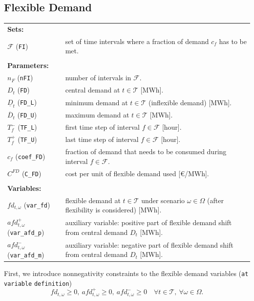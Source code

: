 \subsection{Flexible Demand}
\label{SEC:FlexibleDemand}

\begin{tabularx}{\textwidth}{l X}
\textbf{Sets:} \\
$\mathcal{F}$ (\texttt{FI}) & set of time intervals where a fraction of demand $c_f$ has to be met. \\
\\

\textbf{Parameters:} \\
$n_F$ (\texttt{nFI}) & number of intervals in $\mathcal{F}$. \\
$D_t$ (\texttt{FD}) & central demand at $t \in \mathcal{T}$ [MWh]. \\
$\underline{D}_t$ (\texttt{FD\_L}) & minimum demand at $t \in \mathcal{T}$ (inflexible demand) [MWh]. \\
$\overline{D}_t$ (\texttt{FD\_U}) & maximum demand at $t \in \mathcal{T}$ [MWh]. \\
$T_f^-$ (\texttt{TF\_L}) & first time step of interval $f \in \mathcal{F}$ [hour]. \\
$T_f^+$ (\texttt{TF\_U}) & last time step of interval $f \in \mathcal{F}$ [hour]. \\
$c_f$ (\texttt{coef\_FD}) & fraction of demand that needs to be consumed during interval $f \in \mathcal{F}$. \\
$C^{FD}$ (\texttt{C\_FD}) & cost per unit of flexible demand used [\euro/MWh]. \\
\\

\textbf{Variables:} \\
$fd_{t,\omega}$ (\texttt{var\_fd}) & flexible demand at $t \in \mathcal{T}$ under scenario $\omega \in \Omega$ (after flexibility is considered) [MWh]. \\
$afd_{t,\omega}^+$ (\texttt{var\_afd\_p}) & auxiliary variable: positive part of flexible demand shift from central demand $D_t$ [MWh]. \\
$afd_{t,\omega}^-$ (\texttt{var\_afd\_m}) & auxiliary variable: negative part of flexible demand shift from central demand $D_t$ [MWh]. \\
\end{tabularx}

First, we introduce nonnegativity constraints to the flexible demand variables (\verb|at variable| \verb|definition|)
\begin{equation} \label{EQ:FlexDemandPos}
	fd_{t, \omega} \geq 0, \ afd_{t, \omega}^+ \geq 0, \ afd_{t, \omega}^- \geq 0 \quad \forall t \in \mathcal{T}, \ \forall \omega \in \Omega.
\end{equation}

